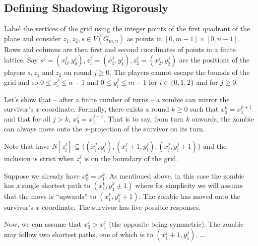 \subsection{Defining Shadowing Rigorously}

Label the vertices of the grid using the integer points of the first quadrant
of the plane and consider $z_1, z_2, s \in V(G_{m,n})$ as points in $[0, m-1] \times [0, n-1]$.
Rows and columns are then first and second coordinates of points in a finite lattice.
Say $s^j = (x^j_0, y^j_0), z^j_1 = (x^j_1, y^j_1), z^j_2 = (x^j_2, y^j_2)$ are the
positions of the players $s, z_1$ and $z_2$ on round $j \geq 0$.
The players cannot escape the bounds of the grid and so
 $0 \leq x^j_i \leq n -1$ and $0 \leq y^j_i \leq m-1$ for $i \in \{0, 1, 2\}$ and for $j \geq 0$.

Let's show that -- after a finite number of turns -- a zombie can mirror
the survivor's $x$-coordinate. Formally, there exists a round $k\geq 0$ such that $x^k_0 = x^{k+1}_1$
and that for all $j > k$, $x^j_0 = x^{j+1}_1$. That is to say, from turn $k$ onwards, the zombie can
always move onto the $x$-projection of the survivor on its turn.

Note that have $N[z^j_i] \subseteq \{ (x^j_i, y^j_i), (x^j_i \pm 1, y^j_i), (x^j_i, y^j_i \pm 1) \}$
and the inclusion is strict when $z^j_i$ is on the boundary of the grid.

Suppose we already have $x^k_0 = x^k_1$. As mentioned above, in this case the
 zombie has a single shortest path to $(x^k_1, y^k_1 \pm 1)$ where for simplicity
 we will assume that the move is ``upwards'' to $(x^k_1, y^k_1 + 1)$. The zombie
 has moved onto the survivor's $x$-coordinate. The survivor has five possible responses.

Now, we can assume that $x^j_0 > x^j_1$ (the opposite being symmetric). The zombie
may follow two shortest paths, one of which is to $(x^j_1 + 1, y^j_1)$.
...
